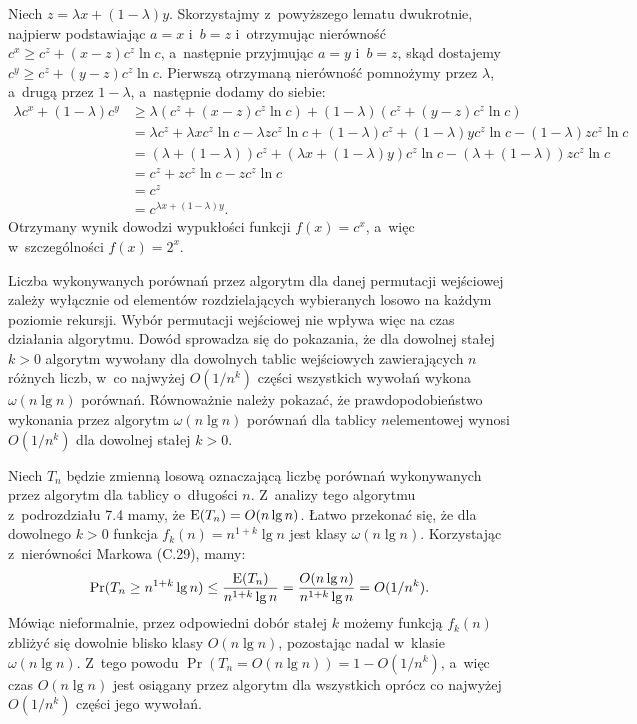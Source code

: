 Niech $z=\lambda x+(1-\lambda)y$.
Skorzystajmy z~powyższego lematu dwukrotnie, najpierw podstawiając $a=x$ i~$b=z$ i~otrzymując nierówność $c^x\ge c^z+(x-z)c^z\ln c$, a~następnie przyjmując $a=y$ i~$b=z$, skąd dostajemy $c^y\ge c^z+(y-z)c^z\ln c$.
Pierwszą otrzymaną nierówność pomnożymy przez $\lambda$, a~drugą przez $1-\lambda$, a~następnie dodamy do siebie:
\begin{align*}
	\lambda c^x+(1-\lambda)c^y &\ge \lambda(c^z+(x-z)c^z\ln c)+(1-\lambda)(c^z+(y-z)c^z\ln c) \\
	&= \lambda c^z+\lambda xc^z\ln c-\lambda zc^z\ln c+(1-\lambda)c^z+(1-\lambda)yc^z\ln c-(1-\lambda)zc^z\ln c \\
	&= (\lambda+(1-\lambda))c^z+(\lambda x+(1-\lambda)y)c^z\ln c-(\lambda+(1-\lambda))zc^z\ln c \\
	&= c^z+zc^z\ln c-zc^z\ln c \\
	&= c^z \\
	&= c^{\lambda x+(1-\lambda)y}.
\end{align*}
Otrzymany wynik dowodzi wypukłości funkcji $f(x)=c^x$, a~więc w~szczególności $f(x)=2^x$.

\exercise %

\noindent Liczba wykonywanych porównań przez algorytm  dla danej permutacji wejściowej zależy wyłącznie od elementów rozdzielających wybieranych losowo na każdym poziomie rekursji.
Wybór permutacji wejściowej nie wpływa więc na czas działania algorytmu.
Dowód sprowadza się do pokazania, że dla dowolnej stałej $k>0$ algorytm  wywołany dla dowolnych tablic wejściowych zawierających $n$ różnych liczb, w~co najwyżej $O(1/n^k)$ części wszystkich wywołań wykona $\omega(n\lg n)$ porównań.
Równoważnie należy pokazać, że prawdopodobieństwo wykonania przez algorytm $\omega(n\lg n)$ porównań dla tablicy $n$\nbhyphen elementowej wynosi $O(1/n^k)$ dla dowolnej stałej $k>0$.

Niech $T_n$ będzie zmienną losową oznaczającą liczbę porównań wykonywanych przez algorytm  dla tablicy o~długości $n$.
Z~analizy tego algorytmu z~podrozdziału 7.4 mamy, że $\operatorname{E}(T_n)=O(n\lg n)$.
Łatwo przekonać się, że dla dowolnego $k>0$ funkcja $f_k(n)=n^{1+k}\lg n$ jest klasy $\omega(n\lg n)$.
Korzystając z~nierówności Markowa (C.29), mamy:
\[
	\Pr(T_n\ge n^{1+k}\lg n) \le \frac{\operatorname{E}(T_n)}{n^{1+k}\lg n} = \frac{O(n\lg n)}{n^{1+k}\lg n} = O(1/n^k).
\]
Mówiąc nieformalnie, przez odpowiedni dobór stałej $k$ możemy funkcją $f_k(n)$ zbliżyć się dowolnie blisko klasy $O(n\lg n)$, pozostając nadal w~klasie $\omega(n\lg n)$.
Z~tego powodu $\Pr(T_n=O(n\lg n))=1-O(1/n^k)$, a~więc czas $O(n\lg n)$ jest osiągany przez algorytm dla wszystkich oprócz co najwyżej $O(1/n^k)$ części jego wywołań.
